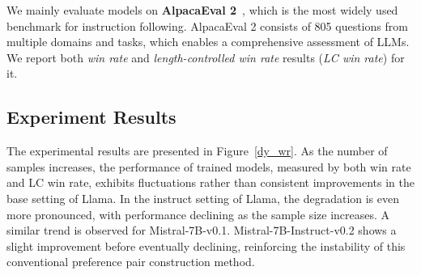 We mainly evaluate models on \textbf{AlpacaEval 2}~\cite{alpaca_eval, dubois2024lengthcontrolled}, which is the most widely used benchmark for instruction following.
AlpacaEval 2 consists of 805 questions from multiple domains and tasks, which enables a comprehensive assessment of LLMs.
We report both \textit{win rate} and \textit{length-controlled win rate} results (\textit{LC win rate}) for it.  
  






\subsection{Experiment Results} 
The experimental results are presented in Figure~\ref{dy_wr}. 
As the number of samples increases, the performance of trained models, measured by both win rate and LC win rate, exhibits fluctuations rather than consistent improvements in the base setting of Llama. 
In the instruct setting of Llama, the degradation is even more pronounced, with performance declining as the sample size increases. 
A similar trend is observed for Mistral-7B-v0.1. 
Mistral-7B-Instruct-v0.2 shows a slight improvement before eventually declining, reinforcing the instability of this conventional preference pair construction method.  

